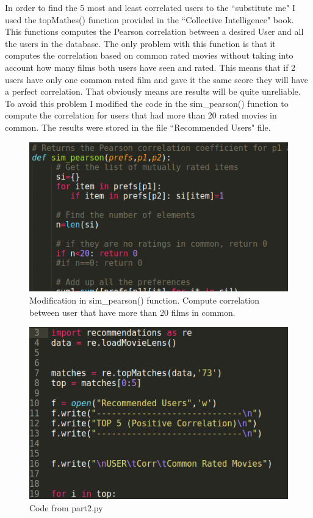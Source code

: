 \documentclass{article}
\begin{document}
In order to find the 5 most and least correlated users to the ``substitute me" I used the topMathes() function provided in the ``Collective Intelligence" book. This functions computes the Pearson correlation between a desired User and all the users in the database. The only problem with this function is that it computes the correlation based on common rated movies without taking into account how many films both users have seen and rated. This means that if 2 users have only one common rated film and gave it the same score they will have a perfect correlation. That obviously means are results will be quite unreliable. To avoid this problem I modified the code in the sim\_pearson() function to compute the correlation for users that had more than 20 rated movies in common. The results were stored in the file ``Recommended Users" file. 


\begin{figure}[H]
 \centering
 	\includegraphics[height=6 cm]{sim_p.png}
  \caption{Modification in sim\_pearson() function. Compute correlation between user that have more than 20 films in common.}
\end{figure}


\begin{figure}[H]
 \centering
 	\includegraphics[height=7 cm]{p2.png}
  \caption{Code from part2.py}
\end{figure}
\end{document}
